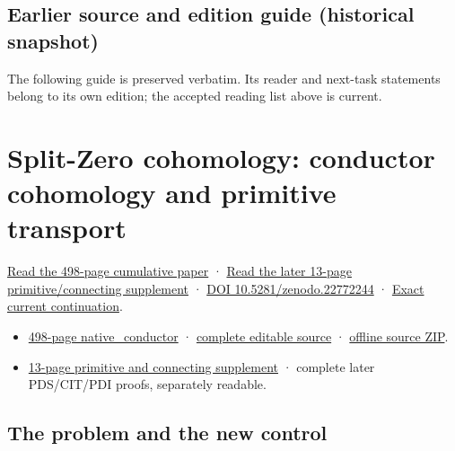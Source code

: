 \documentclass[
]{article}
\providecommand{\tightlist}{%
  \setlength{\itemsep}{0pt}\setlength{\parskip}{0pt}}
\begin{document}
\subsection{Earlier source and edition guide (historical
snapshot)}\label{earlier-source-and-edition-guide-historical-snapshot}

The following guide is preserved verbatim. Its reader and next-task
statements belong to its own edition; the accepted reading list above is
current.

\section{Split-Zero cohomology: conductor cohomology and primitive
transport}\label{split-zero-cohomology-conductor-cohomology-and-primitive-transport}

\href{https://zenodo.org/api/records/22772244/files/71-native-conductor-reader.pdf/content}{Read
the 498-page cumulative paper} ·
\href{https://zenodo.org/api/records/22772244/files/72-primitive-connecting-reader.pdf/content}{Read
the later 13-page primitive/connecting supplement} ·
\href{https://doi.org/10.5281/zenodo.22772244}{DOI
10.5281/zenodo.22772244} ·
\href{https://github.com/KokunoYumeto/zeta-function-research-reader/blob/28e540812ca5d45e8943395e460799888b4e5348/workbenches/splitzero-tandem/continuations/20260915-native-conductor-continuation/00_CONTINUE_HERE.md}{Exact
current continuation}.

\begin{itemize}
\tightlist
\item
  \href{https://zenodo.org/api/records/22772244/files/71-native-conductor-reader.pdf/content}{498-page
  native\_conductor} ·
  \href{https://github.com/KokunoYumeto/zeta-function-research-reader/tree/28e540812ca5d45e8943395e460799888b4e5348/workbenches/splitzero-tandem/continuations/20260915-native-conductor-continuation}{complete
  editable source} ·
  \href{https://zenodo.org/api/records/22772244/files/73-native-conductor-sources.zip/content}{offline
  source ZIP}.
\item
  \href{https://zenodo.org/api/records/22772244/files/72-primitive-connecting-reader.pdf/content}{13-page
  primitive and connecting supplement} · complete later PDS/CIT/PDI
  proofs, separately readable.
\end{itemize}

\subsection{The problem and the new
control}\label{the-problem-and-the-new-control}
\end{document}
